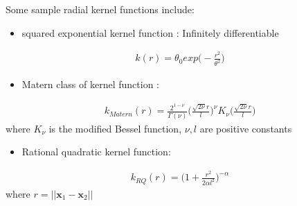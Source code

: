 \documentclass[letterpaper,12pt,english]{sphinxmanual}
\begin{document}
\sphinxAtStartPar
Some sample radial kernel functions include:
\begin{itemize}
\item {} 
\sphinxAtStartPar
squared exponential kernel function : Infinitely differentiable

\end{itemize}
\begin{equation*}
\begin{split}k(r) = \theta_0 exp\Bigg(- \frac{r^2}{\theta^2}\Bigg)\end{split}
\end{equation*}\begin{itemize}
\item {} 
\sphinxAtStartPar
Matern class of kernel function :

\end{itemize}
\begin{equation*}
\begin{split}k_{Matern}(r) = \frac{2^{1-\nu}}{\Gamma(\nu)}\Bigg(\frac{\sqrt{2\nu}r}{l}\Bigg)^\nu K_\nu\Bigg(\frac{\sqrt{2\nu}r}{l}\Bigg)\end{split}
\end{equation*}
\sphinxAtStartPar
where \(K_\nu\) is the modified Bessel function, \(\nu,l\) are positive constants
\begin{itemize}
\item {} 
\sphinxAtStartPar
Rational quadratic kernel function:

\end{itemize}
\begin{equation*}
\begin{split}k_{RQ}(r) = \Bigg(1 + \frac{r^2}{2\alpha l^2}\Bigg)^{-\alpha}\end{split}
\end{equation*}
\sphinxAtStartPar
where \(r = ||\mathbf{x}_1 - \mathbf{x}_2||\)
\end{document}
